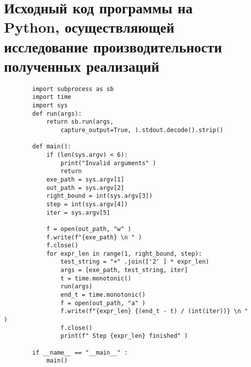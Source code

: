 \documentclass[bachelor, och, coursework]{SCWorks}
\begin{document}
    \section{Исходный код программы на Python, осуществляющей исследование 
    производительности полученных реализаций}\label{Б}
    \begin{verbatim}
        import subprocess as sb
        import time
        import sys
        def run(args):
            return sb.run(args, 
                capture_output=True, ).stdout.decode().strip()

        def main():
            if (len(sys.argv) < 6):
                print("Invalid arguments" )
                return
            exe_path = sys.argv[1]
            out_path = sys.argv[2]
            right_bound = int(sys.argv[3])
            step = int(sys.argv[4])
            iter = sys.argv[5]

            f = open(out_path, "w" )
            f.write(f"{exe_path} \n " )
            f.close()
            for expr_len in range(1, right_bound, step):
                test_string = "+" .join(['2' ] * expr_len)
                args = [exe_path, test_string, iter]
                t = time.monotonic()
                run(args)
                end_t = time.monotonic()
                f = open(out_path, "a" )
                f.write(f"{expr_len} {(end_t - t) / (int(iter))} \n " )
                f.close()
                print(f" Step {expr_len} finished" )

        if __name__ == "__main__" :
            main()
    \end{verbatim}
\end{document}
